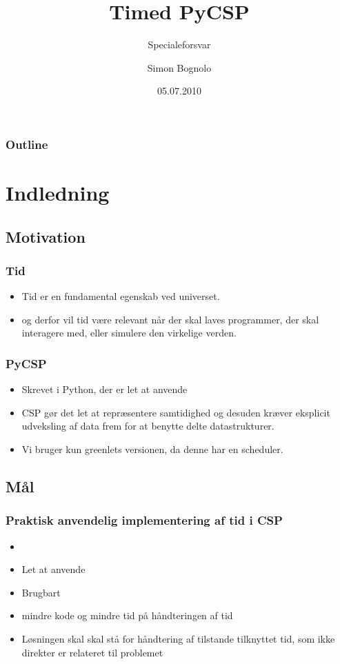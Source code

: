 \documentclass{beamer}
\title
{Timed PyCSP}
\subtitle
{Specialeforsvar}
\author
{Simon Bognolo}
\date
{05.07.2010}
\begin{document}
\begin{frame}
  \titlepage
\end{frame}

\begin{frame}
  \frametitle{Outline}
  \tableofcontents
\end{frame}

\section{Indledning}
\subsection{Motivation}
\begin{frame}
  \frametitle{Tid}
  \begin{itemize}
\item Tid er en fundamental egenskab ved universet.
\item og derfor vil tid være relevant når der skal laves programmer, der skal interagere med, eller simulere den virkelige verden.
  \end{itemize}
\end{frame}

\begin{frame}
  \frametitle{PyCSP}
  \begin{itemize}
\item Skrevet i Python, der er let at anvende
\item CSP  gør det let at repræsentere samtidighed og desuden kræver eksplicit udveksling af data frem for at benytte
delte datastrukturer.
\item Vi bruger kun greenlets versionen, da denne har en scheduler.
  \end{itemize}
\end{frame}

\subsection{Mål}
\begin{frame}
  \frametitle{Praktisk anvendelig implementering af tid i CSP}
  \begin{itemize}
	\item 
	\item Let at anvende
	\item Brugbart
	\item mindre kode og mindre tid på håndteringen af tid
	\item Løsningen skal skal stå for håndtering af tilstande tilknyttet tid, som ikke direkter er relateret til problemet
  \end{itemize}
\end{frame}
\end{document}

